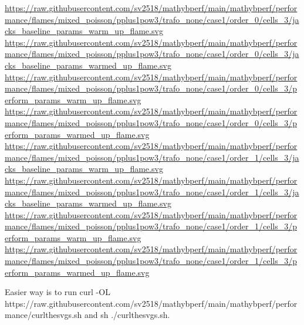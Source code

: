 \url{https://raw.githubusercontent.com/sv2518/mathybperf/main/mathybperf/performance/flames/mixed_poisson/pplus1pow3/trafo_none/case1/order_0/cells_3/jacks_baseline_params_warm_up_flame.svg}
\url{https://raw.githubusercontent.com/sv2518/mathybperf/main/mathybperf/performance/flames/mixed_poisson/pplus1pow3/trafo_none/case1/order_0/cells_3/jacks_baseline_params_warmed_up_flame.svg}
\url{https://raw.githubusercontent.com/sv2518/mathybperf/main/mathybperf/performance/flames/mixed_poisson/pplus1pow3/trafo_none/case1/order_0/cells_3/perform_params_warm_up_flame.svg}
\url{https://raw.githubusercontent.com/sv2518/mathybperf/main/mathybperf/performance/flames/mixed_poisson/pplus1pow3/trafo_none/case1/order_0/cells_3/perform_params_warmed_up_flame.svg}
\url{https://raw.githubusercontent.com/sv2518/mathybperf/main/mathybperf/performance/flames/mixed_poisson/pplus1pow3/trafo_none/case1/order_1/cells_3/jacks_baseline_params_warm_up_flame.svg}
\url{https://raw.githubusercontent.com/sv2518/mathybperf/main/mathybperf/performance/flames/mixed_poisson/pplus1pow3/trafo_none/case1/order_1/cells_3/jacks_baseline_params_warmed_up_flame.svg}
\url{https://raw.githubusercontent.com/sv2518/mathybperf/main/mathybperf/performance/flames/mixed_poisson/pplus1pow3/trafo_none/case1/order_1/cells_3/perform_params_warm_up_flame.svg}
\url{https://raw.githubusercontent.com/sv2518/mathybperf/main/mathybperf/performance/flames/mixed_poisson/pplus1pow3/trafo_none/case1/order_1/cells_3/perform_params_warmed_up_flame.svg}


Easier way is to run curl -OL https://raw.githubusercontent.com/sv2518/mathybperf/main/mathybperf/performance/curlthesvgs.sh
 and sh ./curlthesvgs.sh.
